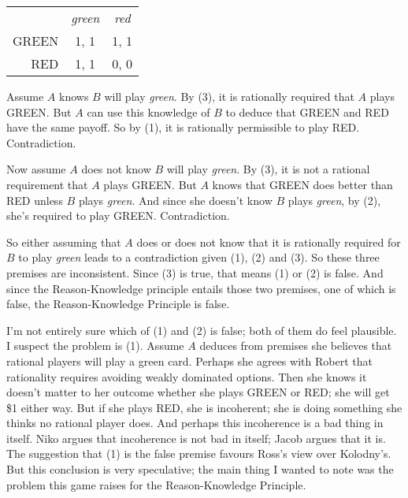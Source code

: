 \begin{center}
\begin{tabular}{r c c}
 & \textit{green} & \textit{red} \\
GREEN & 1, 1 & 1, 1 \\
RED & 1, 1 & 0, 0
\end{tabular}
\end{center}

\noindent Assume $A$ knows $B$ will play \textit{green}. By (3), it is rationally required that $A$ plays GREEN. But $A$ can use this knowledge of $B$ to deduce that GREEN and RED have the same payoff. So by (1), it is rationally permissible to play RED. Contradiction.

Now assume $A$ does not know $B$ will play \textit{green}. By (3), it is not a rational requirement that $A$ plays GREEN. But $A$ knows that GREEN does better than RED unless $B$ plays \textit{green}. And since she doesn't know $B$ plays \textit{green}, by (2), she's required to play GREEN. Contradiction.

So either assuming that $A$ does or does not know that it is rationally required for $B$ to play \textit{green} leads to a contradiction given (1), (2) and (3). So these three premises are inconsistent. Since (3) is true, that means (1) or (2) is false. And since the Reason-Knowledge principle entails those two premises, one of which is false, the Reason-Knowledge Principle is false.

I'm not entirely sure which of (1) and (2) is false; both of them do feel plausible. I suspect the problem is (1). Assume $A$ deduces from premises she believes that rational players will play a green card. Perhaps she agrees with Robert \citet{Stalnaker1998} that rationality requires avoiding weakly dominated options. Then she knows it doesn't matter to her outcome whether she plays GREEN or RED; she will get \$1 either way. But if she plays RED, she is incoherent; she is doing something she thinks no rational player does. And perhaps this incoherence is a bad thing in itself.  Niko \citet{Kolodny2005} argues that incoherence is not bad in itself;  Jacob \citet{Ross2012} argues that it is. The suggestion that (1) is the false premise favours Ross's view over Kolodny's. But this conclusion is very speculative; the main thing I wanted to note was the problem this game raises for the Reason-Knowledge Principle.
